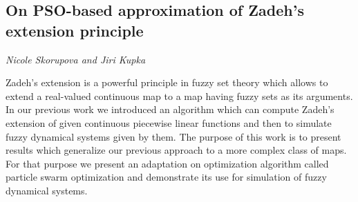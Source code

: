 \documentclass[../booklet.tex]{subfiles}
\begin{document}
\subsection[On PSO-based approximation of Zadeh’s extension principle. {\it Nicole Skorupova and Jiri Kupka}]{On PSO-based approximation of Zadeh’s extension principle}
 

\begin{center}
  {\it Nicole Skorupova and Jiri Kupka}
\end{center}

\vskip 0.8cm


Zadeh's extension is a powerful principle in fuzzy set theory which allows to extend a real-valued continuous map to a map having fuzzy sets as its arguments. In our previous work we introduced an algorithm which can compute Zadeh’s extension of given continuous piecewise linear functions and then to simulate fuzzy dynamical systems given by them. The purpose of this work is to present results which generalize our previous approach to a more complex class of maps. For that purpose we present an adaptation on optimization algorithm called particle swarm optimization and demonstrate its use for simulation of fuzzy dynamical systems.

\end{document}
